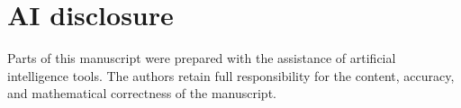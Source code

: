 \documentclass{amsart}
\theoremstyle{definition}
\theoremstyle{plain}
\begin{document}
\section*{AI disclosure}
    
    Parts of this manuscript were prepared with the assistance of artificial intelligence tools. 
    The authors retain full responsibility for the content, accuracy, and mathematical correctness of the manuscript.


\printbibliography


\end{document}
